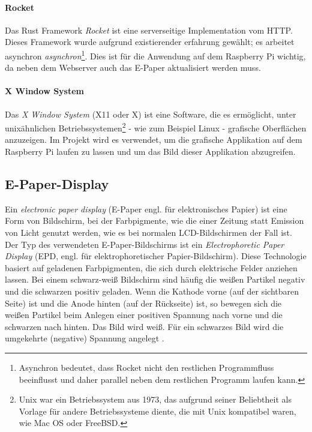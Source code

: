 \documentclass[10pt]{article}
\begin{document}
\paragraph{Rocket}\label{Rocket}
Das Rust Framework \textit{Rocket} ist eine serverseitige Implementation vom HTTP.
Dieses Framework wurde aufgrund existierender erfahrung gewählt; es arbeitet asynchron \textit{asynchron}\footnote{Asynchron bedeutet, dass Rocket nicht den restlichen Programmfluss beeinflusst und daher parallel neben dem restlichen Programm laufen kann.}.  Dies ist für die Anwendung auf dem Raspberry Pi wichtig, da neben dem Webserver auch das E-Paper aktualisiert werden muss\cite{rocket}. 

\paragraph{X Window System}\label{X Window System}
Das \textit{X Window System} (X11 oder X) ist eine Software, die es ermöglicht, unter unixähnlichen Betriebssystemen\noindent\footnote{Unix war ein Betriebssystem aus 1973, das aufgrund seiner Beliebtheit als Vorlage für andere Betriebssysteme diente, die mit Unix kompatibel waren, wie Mac OS oder FreeBSD. } - wie zum Beispiel Linux - grafische Oberflächen anzuzeigen. Im Projekt wird es verwendet, um die grafische Applikation auf dem Raspberry Pi laufen zu lassen und um das Bild dieser Applikation abzugreifen.

\subsection{E-Paper-Display} \label{epaper}
Ein \textit{electronic paper display} (E-Paper engl. für elektronisches Papier) ist eine Form von Bildschirm, bei der Farbpigmente, wie die einer Zeitung statt Emission von Licht genutzt werden, wie es bei normalen LCD-Bildschirmen der Fall ist. Der Typ des verwendeten E-Paper-Bildschirms ist ein \textit{Electrophoretic Paper Display} (EPD, engl. für elektrophoretischer Papier-Bildschirm). Diese Technologie basiert auf geladenen Farbpigmenten, die sich durch elektrische Felder anziehen lassen. Bei einem schwarz-weiß Bildschirm sind häufig die weißen Partikel negativ und die schwarzen positiv geladen. Wenn die Kathode vorne (auf der sichtbaren Seite) ist und die Anode hinten (auf der Rückseite) ist, so bewegen sich die weißen Partikel beim Anlegen einer positiven Spannung nach vorne und die schwarzen nach hinten. Das Bild wird weiß. Für ein schwarzes Bild wird die umgekehrte (negative) Spannung angelegt \cite{epaperstudy}.
\end{document}
